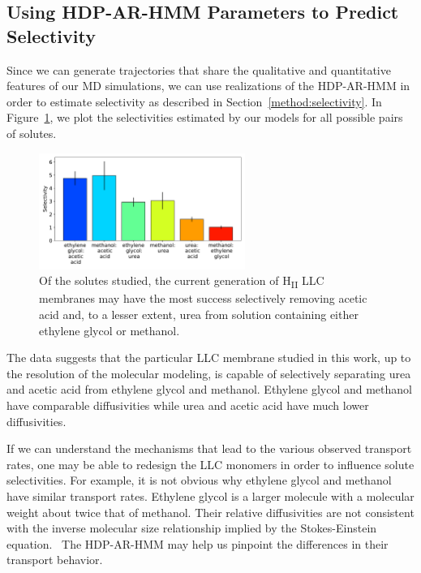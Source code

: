 \documentclass[journal=jpcbfk,manuscript=article]{achemso}
\begin{document}
  \subsection{Using HDP-AR-HMM Parameters to Predict Selectivity}\label{section:macroscopic_properties}
  
  Since we can generate trajectories that share the qualitative and quantitative
  features of our MD simulations, we can use realizations of the HDP-AR-HMM
  in order to estimate selectivity as described in Section~\ref{method:selectivity}.
  In Figure~\ref{fig:selectivity}, we plot the selectivities estimated by our
  models for all possible pairs of solutes.
  
  \begin{figure}
  \centering
  \includegraphics[width=0.6\textwidth]{selectivity.pdf}
  \caption{Of the solutes studied, the current generation of H\textsubscript{II}
  LLC membranes may have the most success selectively removing acetic acid and,
  to a lesser extent, urea from solution containing either ethylene glycol or 
  methanol.
  }\label{fig:selectivity}
  \end{figure}

  The data suggests that the particular LLC membrane studied in this work, 
  up to the resolution of the molecular modeling, is capable of selectively 
  separating urea and acetic acid from ethylene glycol and methanol. Ethylene 
  glycol and methanol have comparable diffusivities while urea and acetic 
  acid have much lower diffusivities. 

  If we can understand the mechanisms that lead to the various observed transport
  rates, one may be able to redesign the LLC monomers in order to influence solute
  selectivities. For example, it is not obvious why ethylene glycol and methanol
  have similar transport rates. Ethylene glycol is a larger molecule with a 
  molecular weight about twice that of methanol. Their relative diffusivities are 
  not consistent with the inverse molecular size relationship implied by the 
  Stokes-Einstein equation.~\cite{gierer_molekulare_1953} The HDP-AR-HMM may 
  help us pinpoint the differences in their transport behavior.
  
\end{document}
